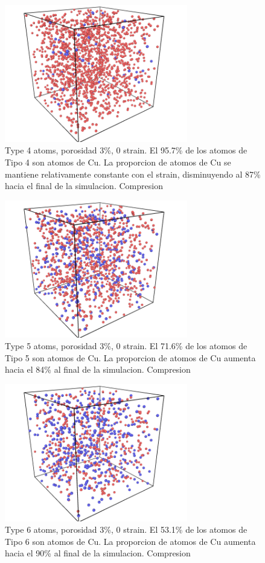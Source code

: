 \documentclass[10pt, oneside]{article} %
\begin{document}
\begin{figure}[H]
\centering
\includegraphics[width=8cm]{Figures/Porosidad/Porosidad_3_CU_tipo4.png}
\caption{Type 4 atoms, porosidad 3\%, 0 strain. El 95.7\% de los atomos de Tipo 4 son atomos de Cu. La proporcion de atomos de Cu se mantiene relativamente constante con el strain, disminuyendo al 87\% hacia el final de la simulacion. Compresion}
\end{figure}

\begin{figure}[H]
\centering
\includegraphics[width=8cm]{Figures/Porosidad/Porosidad_3_CU_tipo5.png}
\caption{Type 5 atoms, porosidad 3\%, 0 strain. El 71.6\% de los atomos de Tipo 5 son atomos de Cu. La proporcion de atomos de Cu  aumenta hacia el 84\% al final de la simulacion. Compresion}
\end{figure}

\begin{figure}[H]
\centering
\includegraphics[width=8cm]{Figures/Porosidad/Porosidad_3_CU_tipo6.png}
\caption{Type 6 atoms, porosidad 3\%, 0 strain. El 53.1\% de los atomos de Tipo 6 son atomos de Cu. La proporcion de atomos de Cu aumenta hacia el 90\% al final de la simulacion. Compresion}
\end{figure}
\end{document}
